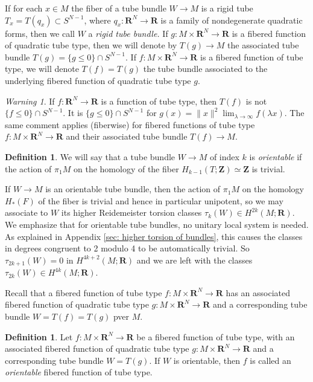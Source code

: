 \documentclass{amsart}
\def\bR{\mathbf{R}}
\def\bZ{\mathbf{Z}}
\theoremstyle{definition}
\newtheorem{definition}[theorem]{Definition}
\theoremstyle{remark}
\newtheorem{inductive lemma}[theorem]{Inductive Lemma}
\newtheorem{warning}[theorem]{Warning}
\begin{document}
If for each $x \in M$ the fiber of a tube bundle $W \to M$ is a rigid tube $T_x=T(q_x) \subset S^{N-1}$, where $q_x:\bR^N \to \bR$ is a family of nondegenerate quadratic forms, then we call $W$ a {\em{rigid tube bundle.}} If $g: M \times \bR^N \to \bR$ is a fibered function of quadratic tube type, then we will denote by $T(g) \to M$ the associated tube bundle $T(g)=\{ g \leq 0\} \cap S^{N-1}$. If $f:M \times \bR^N \to \bR$ is a fibered function of tube type, we will denote $T(f)=T(g)$ the tube bundle associated to the underlying fibered function of quadratic tube type $g$. 

\begin{warning}
If $f:\bR^N \to \bR$ is a function of tube type, then $T(f)$ is not $\{ f \leq 0\} \cap S^{N-1}$. It is $\{ g \leq 0\} \cap S^{N-1}$ for $g(x) = \|x\|^2 \lim_{ \lambda \to \infty} f(\lambda x)$. The same comment applies (fiberwise) for fibered functions of tube type $f:M \times \bR^N \to \bR$ and their associated tube bundle $T(f) \to M$.
\end{warning}

\begin{definition}
\label{def: OrientedTubeBundle}
We will say that a tube bundle $W \to M$ of index $k$ is {\em orientable} if the action of $\pi_1 M$ on the homology of the fiber $H_{k-1}(T;\bZ) \simeq \bZ$ is trivial. 
\end{definition}

If $W \to M$ is an orientable tube bundle, then the action of $\pi_1M$ on the homology $H_*(F)$ of the fiber is trivial and hence in particular unipotent, so we may associate to $W$ its higher Reidemeister torsion classes $\tau_k(W) \in H^{2k}(M;\bR)$. We emphasize that for orientable tube bundles, no unitary local system is needed. As explained in Appendix \ref{sec: higher torsion of bundles}, this causes the classes in degrees congruent to 2 modulo 4 to be automatically trivial. So $\tau_{2k+1}(W)=0$ in $H^{4k+2}(M;\bR)$ and we are left with the classes $\tau_{2k}(W) \in H^{4k}(M;\bR)$. 

Recall that a fibered function of tube type $f:M \times \bR^{N} \to \bR$ has an associated fibered function of quadratic tube type $g:M \times \bR^{N} \to \bR$ and a corresponding tube bundle $W=T(f)=T(g)$ pver $M$.
\begin{definition} Let $f:M \times \bR^N \to \bR$ be a fibered function of tube type, with an associated fibered function of quadratic tube type $g:M \times \bR^N \to \bR$ and a corresponding tube bundle $W=T(g)$. If $W$ is orientable, then $f$ is called an {\em orientable} fibered function of tube type.\end{definition}
\end{document}
